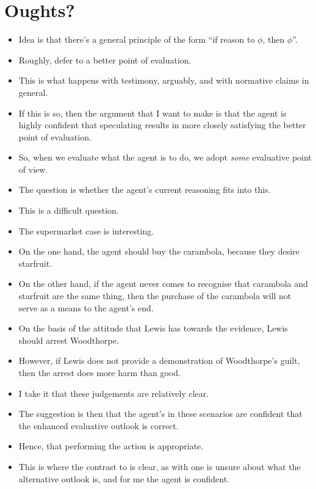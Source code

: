 \documentclass[10pt]{article}
\begin{document}
\section{Oughts?}
\label{sec:oughts}

\begin{itemize}
\item Idea is that there's a general principle of the form ``if reason to \(\phi\), then \(\phi\)''.
\item Roughly, defer to a better point of evaluation.
\item This is what happens with testimony, arguably, and with normative claims in general.
\item If this is so, then the argument that I want to make is that the agent is highly confident that speculating results in more closely satisfying the better point of evaluation.
\end{itemize}


\begin{itemize}
\item So, when we evaluate what the agent is to do, we adopt \emph{some} evaluative point of view.
\item The question is whether the agent's current reasoning fits into this.
\item This is a difficult question.
\item The supermarket case is interesting.
\item On the one hand, the agent should buy the carambola, because they desire starfruit.
\item On the other hand, if the agent never comes to recognise that carambola and starfruit are the same thing, then the purchase of the carambola will not serve as a means to the agent's end.
\item On the basis of the attitude that Lewis has towards the evidence, Lewis should arrest Woodthorpe.
\item However, if Lewis does not provide a demonstration of Woodthorpe's guilt, then the arrest does more harm than good.
\item I take it that these judgements are relatively clear.
\item The suggestion is then that the agent's in these scenarios are confident that the enhanced evaluative outlook is correct.
\item Hence, that performing the action is appropriate.
\item This is where the contrast to \citeauthor{Paul:2014aa} is clear, as with \citeauthor{Paul:2014aa} one is unsure about what the alternative outlook is, and for me the agent is confident.
\end{itemize}
\end{document}
